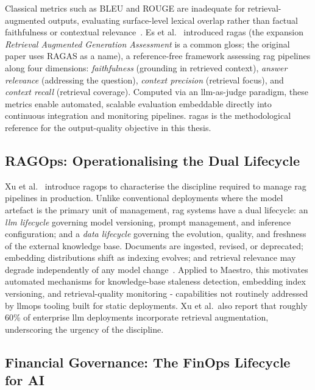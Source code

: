 Classical metrics such as BLEU and ROUGE are inadequate for retrieval-augmented outputs, evaluating surface-level lexical overlap rather than factual faithfulness or contextual relevance~\cite{es2023ragas}. Es et al.~\cite{es2023ragas} introduced \gls{ragas} (the expansion \textit{Retrieval Augmented Generation Assessment} is a common gloss; the original paper uses RAGAS as a name), a reference-free framework assessing \gls{rag} pipelines along four dimensions: \textit{faithfulness} (grounding in retrieved context), \textit{answer relevance} (addressing the question), \textit{context precision} (retrieval focus), and \textit{context recall} (retrieval coverage). Computed via an \gls{llm}-as-judge paradigm, these metrics enable automated, scalable evaluation embeddable directly into continuous integration and monitoring pipelines. %
\Gls{ragas} is the methodological reference for the output-quality objective in this thesis.

\subsection{RAGOps: Operationalising the Dual Lifecycle}

Xu et al.~\cite{xu2025ragops} introduce \acrfull{ragops} to characterise the discipline required to manage \gls{rag} pipelines in production. Unlike conventional deployments where the model artefact is the primary unit of management, \gls{rag} systems have a dual lifecycle: an \textit{\gls{llm} lifecycle} governing model versioning, prompt management, and inference configuration; and a \textit{data lifecycle} governing the evolution, quality, and freshness of the external knowledge base. Documents are ingested, revised, or deprecated; embedding distributions shift as indexing evolves; and retrieval relevance may degrade independently of any model change~\cite{xu2025ragops}. Applied to Maestro, this motivates automated mechanisms for knowledge-base staleness detection, embedding index versioning, and retrieval-quality monitoring - capabilities not routinely addressed by \gls{llmops} tooling built for static deployments. Xu et al.\ also report that roughly 60\% of enterprise \gls{llm} deployments incorporate retrieval augmentation, underscoring the urgency of the discipline.

\subsection{Financial Governance: The FinOps Lifecycle for AI}

